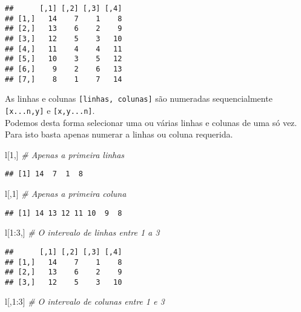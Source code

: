 \documentclass[
]{book}
\newenvironment{Shaded}{\begin{snugshade}}{\end{snugshade}}
\newcommand{\CommentTok}[1]{\textcolor[rgb]{0.56,0.35,0.01}{\textit{#1}}}
\newcommand{\DecValTok}[1]{\textcolor[rgb]{0.00,0.00,0.81}{#1}}
\newcommand{\NormalTok}[1]{#1}
\newcommand{\SpecialCharTok}[1]{\textcolor[rgb]{0.00,0.00,0.00}{#1}}
\begin{document}
\begin{verbatim}
##      [,1] [,2] [,3] [,4]
## [1,]   14    7    1    8
## [2,]   13    6    2    9
## [3,]   12    5    3   10
## [4,]   11    4    4   11
## [5,]   10    3    5   12
## [6,]    9    2    6   13
## [7,]    8    1    7   14
\end{verbatim}

As linhas e colunas \texttt{{[}linhas,\ colunas{]}} são numeradas sequencialmente \texttt{{[}x...n,y{]}} e \texttt{{[}x,y...n{]}}.\\
Podemos desta forma selecionar uma ou várias linhas e colunas de uma só vez. Para isto basta apenas numerar a linhas ou coluna requerida.

\begin{Shaded}
\begin{Highlighting}[]
\NormalTok{l[}\DecValTok{1}\NormalTok{,] }\CommentTok{\# Apenas a primeira linhas}
\end{Highlighting}
\end{Shaded}

\begin{verbatim}
## [1] 14  7  1  8
\end{verbatim}

\begin{Shaded}
\begin{Highlighting}[]
\NormalTok{l[,}\DecValTok{1}\NormalTok{] }\CommentTok{\# Apenas a primeira coluna}
\end{Highlighting}
\end{Shaded}

\begin{verbatim}
## [1] 14 13 12 11 10  9  8
\end{verbatim}

\begin{Shaded}
\begin{Highlighting}[]
\NormalTok{l[}\DecValTok{1}\SpecialCharTok{:}\DecValTok{3}\NormalTok{,] }\CommentTok{\# O intervalo de linhas entre 1 a 3}
\end{Highlighting}
\end{Shaded}

\begin{verbatim}
##      [,1] [,2] [,3] [,4]
## [1,]   14    7    1    8
## [2,]   13    6    2    9
## [3,]   12    5    3   10
\end{verbatim}

\begin{Shaded}
\begin{Highlighting}[]
\NormalTok{l[,}\DecValTok{1}\SpecialCharTok{:}\DecValTok{3}\NormalTok{] }\CommentTok{\# O intervalo de colunas entre 1 e 3}
\end{Highlighting}
\end{Shaded}
\end{document}
